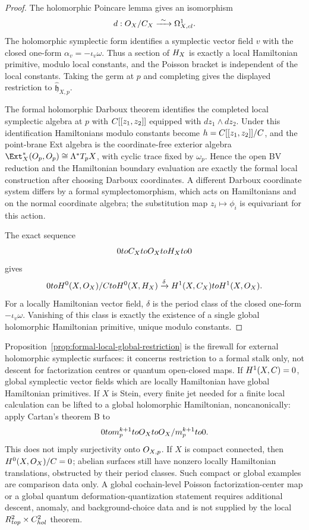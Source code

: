 \documentclass[11pt]{memoir}
\begin{document}
\begin{proof}
  The holomorphic Poincare lemma gives an isomorphism
  $$d:\mc O_X/\C_X\xrightarrow{\ \sim\ }\Omega^1_{X,\mathrm{cl}}.$$
  The holomorphic symplectic form identifies a symplectic vector field $v$
  with the closed one-form $\alpha_v=-\iota_v\omega$. Thus a section of
  $H_X$ is exactly a local Hamiltonian primitive, modulo local
  constants, and the Poisson bracket is independent of the local constants.
  Taking the germ at $p$ and completing gives the displayed restriction to
  $\widehat{\mathfrak h}_{X,p}$.

  The formal holomorphic Darboux theorem identifies the completed local
  symplectic algebra at $p$ with $C[[z_1,z_2]]$ equipped with
  $dz_1\wedge dz_2$. Under this identification Hamiltonians modulo
  constants become $h=C[[z_1,z_2]]/C$, and the
  point-brane Ext algebra is the coordinate-free exterior algebra
  $\Ext_X^*(\mc O_p,\mc O_p)\cong\Lambda^*T_pX$, with cyclic trace fixed by
  $\omega_p$. Hence the open BV reduction and the Hamiltonian boundary
  evaluation are exactly the formal local construction after choosing
  Darboux coordinates. A different Darboux coordinate system differs by a
  formal symplectomorphism, which acts on Hamiltonians and on the normal
  coordinate algebra; the substitution map $z_i\mapsto\phi_i$ is
  equivariant for this action.

  The exact sequence
  $$0toC_XtoO_XtoH_Xto0$$
  gives
  $$0to H^0(X,O_X)/C
    to H^0(X,H_X)
    \xrightarrow{\delta}H^1(X,C_X)
    to H^1(X,O_X).$$
  For a locally Hamiltonian vector field, $\delta$ is the period class of
  the closed one-form $-\iota_v\omega$. Vanishing of this class is exactly
  the existence of a single global holomorphic Hamiltonian primitive,
  unique modulo constants.
\end{proof}

\begin{rmk}
  Proposition~\ref{prop:formal-local-global-restriction} is the
  firewall for external holomorphic symplectic surfaces: it concerns
  restriction to a formal stalk only, not descent for factorization
  centres or quantum open-closed maps. If $H^1(X,C)=0$, global
  symplectic vector fields which are locally Hamiltonian have global
  Hamiltonian primitives. If $X$ is Stein, every
  finite jet needed for a finite local calculation can be lifted to a
  global holomorphic Hamiltonian, noncanonically: apply Cartan's theorem B
  to
  $$0tom_p^{k+1}toO_Xto
    O_X/m_p^{k+1}to0.$$
  This does not imply surjectivity onto $O_{X,p}$. If $X$ is
  compact connected, then $H^0(X,O_X)/C=0$; abelian surfaces still
  have nonzero locally Hamiltonian translations, obstructed by their period
  classes. Such compact or global examples are comparison data only. A
  global cochain-level Poisson factorization-center map or a global quantum
  deformation-quantization statement requires additional descent, anomaly,
  and background-choice data and is not supplied by the local
  \(R^2_{top}\times C^2_{hol}\) theorem.
\end{rmk}
\end{document}
